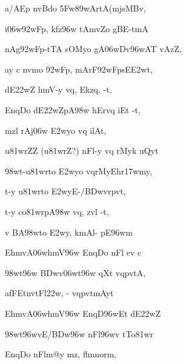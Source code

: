 {\dn a/AEp nvB\?do \35Fw\389wArtA(mjsMBv,{\dandabdn} \dontdisplaylinenum}

{\dn i\306w\392wFp, kf\?z\396w tAm\5vZo{\qvb} gBE-tmA \vegdn\dontdisplaylinenum}

{\dn nAg\392wFp-tTA sOMyo gA\306wDv\0\396wAT vAzZ,{\dandabdn} \dontdisplaylinenum}

{\dn ay\2 c nvmo \392wFp, mArF\392wFps\2E\3E2wt,{\dandadn}\dontdisplaylinenum }

{\dn dE\322wZ\? h\?mV-y vq\0, Ek\2zq, -t, \vegdn\dontdisplaylinenum}

{\dn EnqDo dE\322wZpA\398w\?{\qvb} hErvq\0 iEt -t,{\dandabdn} \dontdisplaylinenum}

{\dn m\?zl\?  rAj\?\306w \3E2w\?yo vq\0 ilAt, \vegdn\dontdisplaylinenum}

{\dn u\381wrZ\?Z {\rs (\re}u\381wr\?Z{\rs ?)\re}  nFl-y vq\0 rMyk uQyt\?{\dandabdn} \dontdisplaylinenum}

{\dn \398w\?t{\rs -\re}u\381wrto \3E2w\?yo vq\0rMyEhr\317wmy, \vegdn\dontdisplaylinenum}

{\dn t-y u\381wrto \3E2w\?yE-/\3BDwvrpv\0t,{\dandabdn} \dontdisplaylinenum}

{\dn t-y co\381wrpA\398w\?{\qvb}  vq\0, zvl\? -t, \vegdn\dontdisplaylinenum}

{\dn {}v{\rdt} BA\398wto \3E2w\?y, k\?mAl- pE\396wm\?{\dandabdn} \dontdisplaylinenum}

{\dn Ehm\2vA\306wh\?mV\396w EnqDo nFl ev c \vegdn\dontdisplaylinenum}

{\dn \398w\?t\396w \3BDwv\306wt\396w qX\?t\? vq\0pv\0tA,{\dandabdn} \dontdisplaylinenum}

{\dn afFEtnvtFl\322w, {\rs -\re} vq\0pv\0tmAyt \vegdn\dontdisplaylinenum}

{\dn EhmvA\306wh\?mV\396w EnqD\396w\?Et dE\322wZ{\dandabdn} \dontdisplaylinenum}

{\dn \398w\?t\396w\4vE/\3BDw\396w nFl\396w\4v tTo\381wr\? \vegdn\dontdisplaylinenum}

{\dn EnqDo nFlm@y\?  m\?z, f\4lmnorm,{\dandabdn} \dontdisplaylinenum}

